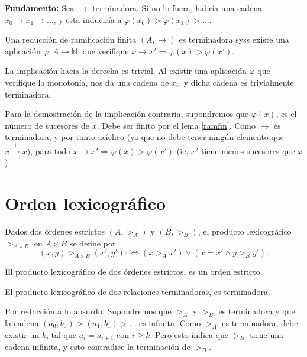 \textbf{Fundamento:} Sea $\rightarrow$ terminadora. Si no lo fuera, habría una
cadena $x_0 \rightarrow x_1 \rightarrow \dots$, y esta induciría a
$\varphi(x_0) > \varphi(x_1) > \dots$.

\begin{lema}
  Una reducción de ramificación finita $(A,\rightarrow)$ es terminadora syss
  existe una aplicación $\varphi : A \rightarrow \mathbb{N}$, que verifique
  $x \rightarrow x' \Rightarrow \varphi(x) > \varphi(x').$
\end{lema}

\begin{demo}
  La implicación hacia la derecha es trivial. Al existir una aplicación
  $\varphi$ que verifique la monotonía, nos da una cadena de $x_i$, y dicha
  cadena es trivialmente terminadora.

  Para la demostración de la implicación contraria, supondremos que
  $\varphi(x)$, es el número de sucesores de $x$. Debe ser finito por el lema
  \ref{ramfin}. Como $\rightarrow$ es terminadora, y por tanto acíclico (ya que
  no debe tener ningún elemento que $x \xrightarrow{+} x$), para todo
  $x \rightarrow x' \Rightarrow \varphi(x) > \varphi(x')$ (ie, $x'$ tiene menos
  sucesores que $x$).
\end{demo}


\section{Orden lexicográfico}\label{orlexi}

\begin{defi} 
  Dados dos órdenes estrictos $(A, >_A)$ y $(B, >_B)$, el producto
  lexicográfico $>_{A \times B}$ en $ A \times B$ se define por
  \[(x,y) >_{A \times B} (x',y') :\Leftrightarrow (x >_A x') \vee (x = x' \wedge y >_B y').\]
\end{defi}

\begin{lema}
  El producto lexicográfico de dos órdenes estrictos, es un orden estricto.
\end{lema}

\begin{teor}
  El producto lexicográfico de dos relaciones terminadoras, es terminadora.
\end{teor}

\begin{demo}
  Por reducción a lo absurdo. Supondremos que $>_A$ y $>_B$ es terminadora y que
  la cadena $(a_0,b_0) > (a_1,b_1) > \dots$ es infinita. Como $>_A$ es
  terminadora, debe existir un $k$, tal que $a_i = a_{i+1}$ con $i\geq k$. Pero
  esto indica que $>_B$ tiene una cadena infinita, y esto contradice la
  terminación de $>_B$.
\end{demo}

